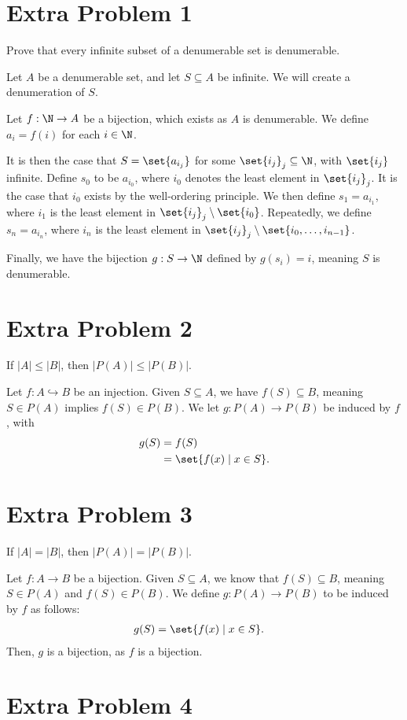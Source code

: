 \documentclass[10pt]{mypackage}
\begin{document}
\section{Extra Problem 1}%
\begin{problem}
  Prove that every infinite subset of a denumerable set is denumerable.
\end{problem}
\begin{solution}
  Let $A$ be a denumerable set, and let $S\subseteq A$ be infinite. We will create a denumeration of $S$.\newline

  Let $f: \N\rightarrow A$ be a bijection, which exists as $A$ is denumerable. We define $a_i = f(i)$ for each $i\in \N$.\newline

  It is then the case that $S = \set{a_{i_j}}$ for some $\set{i_j}_{j}\subseteq \N$, with $\set{i_j}$ infinite. Define $s_0$ to be $a_{i_0}$, where $i_0$ denotes the least element in $\set{i_j}_{j}$. It is the case that $i_0$ exists by the well-ordering principle. We then define $s_1 = a_{i_1}$, where $i_1$ is the least element in $\set{i_j}_{j}\setminus \set{i_0}$. Repeatedly, we define $s_n = a_{i_n}$, where $i_n$ is the least element in $\set{i_j}_{j}\setminus \set{i_0,\dots,i_{n-1}}$.\newline

  Finally, we have the bijection $g: S\rightarrow \N$ defined by $g\left(s_i\right) = i$, meaning $S$ is denumerable.
\end{solution}
\section{Extra Problem 2}%
\begin{problem}
  If $|A| \leq |B|$, then $|P(A)| \leq |P(B)|$.
\end{problem}
\begin{solution}
  Let $f: A\hookrightarrow B$ be an injection. Given $S\subseteq A$, we have $f(S) \subseteq B$, meaning $S\in P(A)$ implies $f(S)\in P(B)$. We let $g: P(A)\rightarrow P(B)$ be induced by $f$, with 
  \begin{align*}
    g(S) &= f(S)\\
         &= \set{f(x)\mid x\in S}.
  \end{align*}
\end{solution}
\section{Extra Problem 3}%
\begin{problem}
  If $|A| = |B|$, then $|P(A)| = |P(B)|$.
\end{problem}
\begin{solution}
  Let $f: A\rightarrow B$ be a bijection. Given $S\subseteq A$, we know that $f(S)\subseteq B$, meaning $S\in P\left(A\right)$ and $f(S)\in P\left(B\right)$. We define $g: P(A) \rightarrow P(B)$ to be induced by $f$ as follows:
  \begin{align*}
    g(S) &= \set{f(x)\mid x\in S}.
  \end{align*}
  Then, $g$ is a bijection, as $f$ is a bijection.
\end{solution}
\section{Extra Problem 4}%
\end{document}
